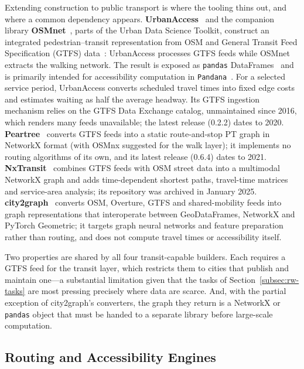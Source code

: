 \documentclass[smartcities,article,submit,moreauthors]{Definitions/mdpi}
\begin{document}
    Extending construction to public transport is where the tooling thins out, and where a common
    dependency appears.
    \textbf{UrbanAccess}~\cite{blanchard2017urbanaccess} and the companion library
    \textbf{OSMnet}~\cite{osmnet_github}, parts of the Urban Data Science Toolkit, construct an
    integrated pedestrian--transit representation from OSM and General Transit Feed Specification
    (GTFS) data~\cite{gtfs_spec}: UrbanAccess processes GTFS feeds while OSMnet extracts the walking
    network.
    The result is exposed as \texttt{pandas} DataFrames~\cite{mckinney2010pandas} and is primarily
    intended for accessibility computation in \texttt{Pandana}~\cite{foti2014pandana}.
    For a selected service period, UrbanAccess converts scheduled travel times into fixed edge costs
    and estimates waiting as half the average headway.
    Its GTFS ingestion mechanism relies on the GTFS Data Exchange catalog, unmaintained since 2016,
    which renders many feeds unavailable; the latest release (0.2.2) dates to 2020.
    \textbf{Peartree}~\cite{peartree_github} converts GTFS feeds into a static route-and-stop PT graph
    in NetworkX format (with OSMnx suggested for the walk layer); it implements no routing algorithms
    of its own, and its latest release (0.6.4) dates to 2021.
    \textbf{NxTransit}~\cite{nxtransit} combines GTFS feeds with OSM street data into a multimodal
    NetworkX graph and adds time-dependent shortest paths, travel-time matrices and service-area
    analysis; its repository was archived in January 2025.
    \textbf{city2graph}~\cite{city2graph} converts OSM, Overture, GTFS and shared-mobility feeds into
    graph representations that interoperate between GeoDataFrames, NetworkX and PyTorch Geometric;
    it targets graph neural networks and feature preparation rather than routing, and does not compute
    travel times or accessibility itself.

    Two properties are shared by all four transit-capable builders.
    Each requires a GTFS feed for the transit layer, which restricts them to cities that publish and
    maintain one---a substantial limitation given that the tasks of
    Section~\ref{subsec:rw-tasks} are most pressing precisely where data are scarce.
    And, with the partial exception of city2graph's converters, the graph they return is a
    NetworkX or \texttt{pandas} object that must be handed to a separate library before large-scale
    computation.

    \subsection{Routing and Accessibility Engines}
    \label{subsec:rw-routing}
\end{document}
